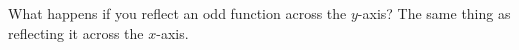 {What happens if you reflect an odd function across the $y$-axis? }
{The same thing as reflecting it across the $x$-axis.}